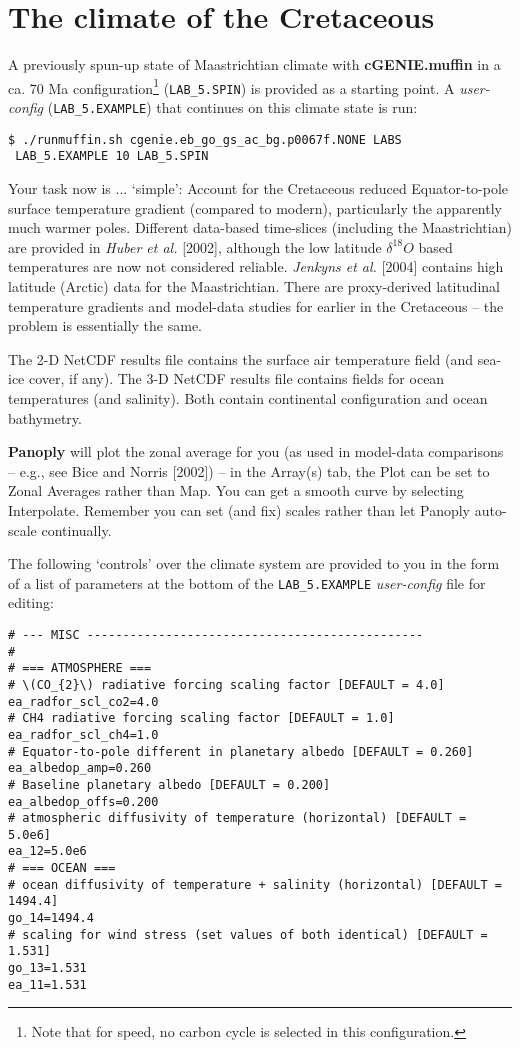 \documentclass[11pt,fleqn]{book} %
\begin{document}
\newpage


\section{The climate of the Cretaceous}

A previously spun-up state of Maastrichtian climate with \textbf{cGENIE.muffin} in a ca. 70 Ma configuration\footnote{Note that for speed, no carbon cycle is selected in this configuration.} (\texttt{LAB\_5.SPIN}) is provided as a starting point. A \textit{user-config} (\texttt{LAB\_5.EXAMPLE}) that continues on this climate state is run:
\begin{verbatim}
$ ./runmuffin.sh cgenie.eb_go_gs_ac_bg.p0067f.NONE LABS 
 LAB_5.EXAMPLE 10 LAB_5.SPIN 
\end{verbatim}

Your task now is ... ‘simple’: Account for the Cretaceous reduced Equator-to-pole surface temperature gradient (compared to modern), particularly the apparently much warmer poles. Different data-based time-slices (including the Maastrichtian) are provided in \textit{Huber et al.} [2002], although the low latitude \(\delta^{18}O\) based temperatures are now not considered reliable. \textit{Jenkyns et al.} [2004] contains high latitude (Arctic) data for the Maastrichtian. There are proxy-derived latitudinal temperature gradients and model-data studies for earlier in the Cretaceous – the problem is essentially the same.

The 2-D NetCDF results file contains the surface air temperature field (and sea-ice cover, if any). The 3-D NetCDF results file contains fields for ocean temperatures (and salinity). Both contain continental configuration and ocean bathymetry.

\textbf{Panoply} will plot the zonal average for you (as used in model-data comparisons – e.g., see Bice and Norris [2002]) – in the Array(s) tab, the Plot can be set to Zonal Averages rather than Map. You can get a smooth curve by selecting Interpolate. Remember you can set (and fix) scales rather than let Panoply auto-scale continually.

The following ‘controls’ over the climate system are provided to you in the form of a list of parameters at the bottom of the \texttt{LAB\_5.EXAMPLE} \textit{user-config} file for editing:

\small\begin{verbatim}
# --- MISC -----------------------------------------------
#
# === ATMOSPHERE ===
# \(CO_{2}\) radiative forcing scaling factor [DEFAULT = 4.0]
ea_radfor_scl_co2=4.0
# CH4 radiative forcing scaling factor [DEFAULT = 1.0]
ea_radfor_scl_ch4=1.0
# Equator-to-pole different in planetary albedo [DEFAULT = 0.260]
ea_albedop_amp=0.260
# Baseline planetary albedo [DEFAULT = 0.200]
ea_albedop_offs=0.200
# atmospheric diffusivity of temperature (horizontal) [DEFAULT = 5.0e6]
ea_12=5.0e6
# === OCEAN ===
# ocean diffusivity of temperature + salinity (horizontal) [DEFAULT = 1494.4]
go_14=1494.4
# scaling for wind stress (set values of both identical) [DEFAULT = 1.531]
go_13=1.531
ea_11=1.531
\end{verbatim}\normalsize
\end{document}
